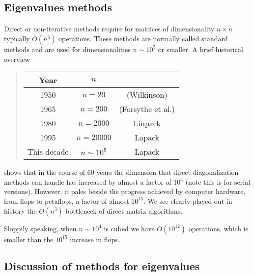 \documentclass[%
oneside,                 %
final,                   %
10pt]{article}
\begin{document}
\noindent



\subsection*{Eigenvalues methods}

\paragraph{}
Direct or non-iterative methods  require for matrices of dimensionality $n\times n$ typically $O(n^3)$ operations. These methods are normally called standard methods and are used for dimensionalities
$n \sim 10^5$ or smaller. A brief historical overview  


\begin{quote}
\begin{tabular}{ccc}
\hline
\multicolumn{1}{c}{ Year } & \multicolumn{1}{c}{ $n$ } & \multicolumn{1}{c}{  } \\
\hline
1950        & $n=20$       & (Wilkinson)       \\
1965        & $n=200$      & (Forsythe et al.) \\
1980        & $n=2000$     & Linpack           \\
1995        & $n=20000$    & Lapack            \\
This decade & $n\sim 10^5$ & Lapack            \\
\hline
\end{tabular}
\end{quote}

\noindent
shows that in the course of 60 years the dimension that  direct diagonalization methods can handle  has increased by almost a factor of
$10^4$ (note this is for serial versions). However, it pales beside the progress achieved by computer hardware, from flops to petaflops, a factor of almost $10^{15}$. We see clearly played out in history the $O(n^3)$ bottleneck  of direct matrix algorithms.

Sloppily speaking, when  $n\sim 10^4$ is cubed we have $O(10^{12})$ operations, which is smaller than the $10^{15}$ increase in flops.



\subsection*{Discussion of methods for eigenvalues}
\end{document}
